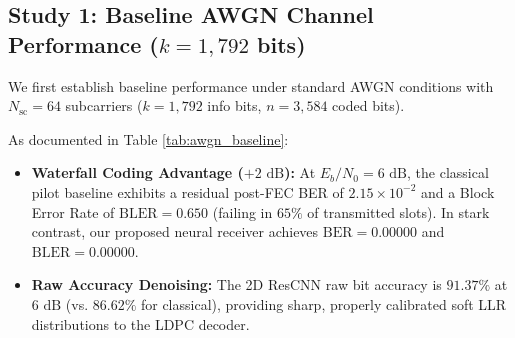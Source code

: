 \documentclass[journal]{IEEEtran}
\begin{document}
\subsection{Study 1: Baseline AWGN Channel Performance ($k=1,792$ bits)}
We first establish baseline performance under standard AWGN conditions with $N_{\text{sc}} = 64$ subcarriers ($k = 1,792$ info bits, $n = 3,584$ coded bits).

As documented in Table \ref{tab:awgn_baseline}:
\begin{itemize}
    \item \textbf{Waterfall Coding Advantage ($+2\text{ dB}$):} At $E_b/N_0 = 6\text{ dB}$, the classical pilot baseline exhibits a residual post-FEC BER of $2.15 \times 10^{-2}$ and a Block Error Rate of $\text{BLER} = 0.650$ (failing in $65\%$ of transmitted slots). In stark contrast, our proposed neural receiver achieves $\text{BER} = 0.00000$ and $\text{BLER} = 0.00000$.
    \item \textbf{Raw Accuracy Denoising:} The 2D ResCNN raw bit accuracy is $91.37\%$ at $6\text{ dB}$ (vs. $86.62\%$ for classical), providing sharp, properly calibrated soft LLR distributions to the LDPC decoder.
\end{itemize}

\begin{table}[!t]
\caption{AWGN Performance Comparison ($k=1,792$ bits, $N_{\text{sc}}=64$)}
\label{tab:awgn_baseline}
\centering
{}
\end{table}
\end{document}
